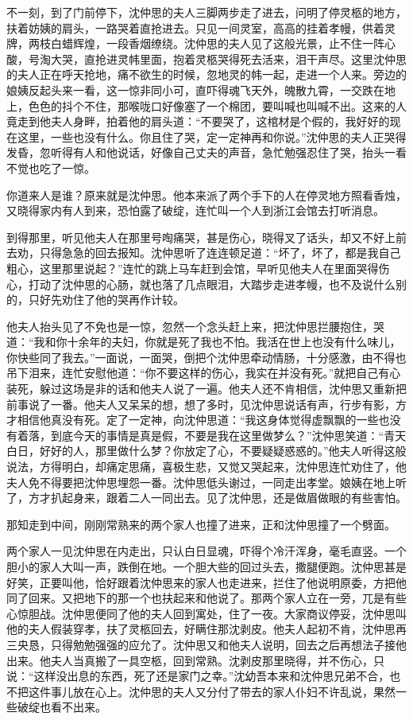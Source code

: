 \documentclass[12pt,UTF8]{ctexbook}
\begin{document}
{{{不一刻，到了门前停下，沈仲思的夫人三脚两步走了进去，问明了停灵柩的地方，扶着妨姨的肩头，一路哭着直抢进去。只见一间灵室，高高的挂着孝幔，供着灵牌，两枝白蜡辉煌，一段香烟缭绕。沈仲思的夫人见了这般光景，止不住一阵心酸，号淘大哭，直抢进灵帏里面，抱着灵柩哭得死去活来，泪干声尽。这里沈仲思的夫人正在呼天抢地，痛不欲生的时候，忽地灵的帏一起，走进一个人来。旁边的娘姨反起头来一看，这一惊非同小可，直吓得魂飞天外，魄散九霄，一交跌在地上，色色的抖个不住，那喉咙口好像塞了一个棉团，要叫喊也叫喊不出。这来的人竟走到他夫人身畔，拍着他的肩头道：“不要哭了，这棺材是个假的，我好好的现在这里，一些也没有什么。你且住了哭，定一定神再和你说。”沈仲思的夫人正哭得发昏，忽听得有人和他说话，好像自己丈夫的声音，急忙勉强忍住了哭，抬头一看不觉也吃了一惊。

你道来人是谁？原来就是沈仲思。他本来派了两个手下的人在停灵地方照看香烛，又晓得家内有人到来，恐怕露了破绽，连忙叫一个人到浙江会馆去打听消息。

到得那里，听见他夫人在那里号啕痛哭，甚是伤心，晓得叉了话头，却又不好上前去劝，只得急急的回去报知。沈仲思听了连连顿足道：“坏了，坏了，都是我自己粗心，这里那里说起？”连忙的跳上马车赶到会馆，早听见他夫人在里面哭得伤心，打动了沈仲思的心肠，就也落了几点眼泪，大踏步走进孝幔，也不及说什么别的，只好先劝住了他的哭再作计较。

他夫人抬头见了不免也是一惊，忽然一个念头赶上来，把沈仲思拦腰抱住，哭道：“我和你十余年的夫妇，你就是死了我也不怕。我活在世上也没有什么味儿，你快些同了我去。”一面说，一面哭，倒把个沈仲思牵动情肠，十分感激，由不得也吊下泪来，连忙安慰他道：“你不要这样的伤心，我实在并没有死。”就把自己有心装死，躲过这场是非的话和他夫人说了一遍。他夫人还不肯相信，沈仲思又重新把前事说了一番。他夫人又呆呆的想，想了多时，见沈仲思说话有声，行步有影，方才相信他真没有死。定了一定神，向沈仲思道：“我这身体觉得虚飘飘的一些也没有着落，到底今天的事情是真是假，不要是我在这里做梦么？”沈仲思笑道：“青天白日，好好的人，那里做什么梦？你放定了心，不要疑疑惑惑的。”他夫人听得这般说法，方得明白，却痛定思痛，喜极生悲，又觉又哭起来，沈仲思连忙劝住了，他夫人免不得要把沈仲思埋怨一番。沈仲思低头谢过，一同走出孝堂。娘姨在地上听了，方才扒起身来，跟着二人一同出去。见了沈仲思，还是做眉做眼的有些害怕。

那知走到中间，刚刚常熟来的两个家人也撞了进来，正和沈仲思撞了一个劈面。

两个家人一见沈仲思在内走出，只认白日显魂，吓得个冷汗浑身，毫毛直竖。一个胆小的家人大叫一声，跌倒在地。一个胆大些的回过头去，撒腿便跑。沈仲思甚是好笑，正要叫他，恰好跟着沈仲思来的家人也走进来，拦住了他说明原委，方把他同了回来。又把地下的那一个也扶起来和他说了。那两个家人立在一旁，兀是有些心惊胆战。沈仲思便同了他的夫人回到寓处，住了一夜。大家商议停妥，沈仲思叫他的夫人假装穿孝，扶了灵柩回去，好瞒住那沈剥皮。他夫人起初不肯，沈仲思再三央恳，只得勉勉强强的应允了。沈仲思又和他夫人说明，回去之后再想法子接他出来。他夫人当真搬了一具空柩，回到常熟。沈剥皮那里晓得，并不伤心，只说：“这样没出息的东西，死了还是家门之幸。”沈幼吾本来和沈仲思兄弟不合，也不把这件事儿放在心上。沈仲思的夫人又分付了带去的家人仆妇不许乱说，果然一些破绽也看不出来。

}}}
\end{document}
